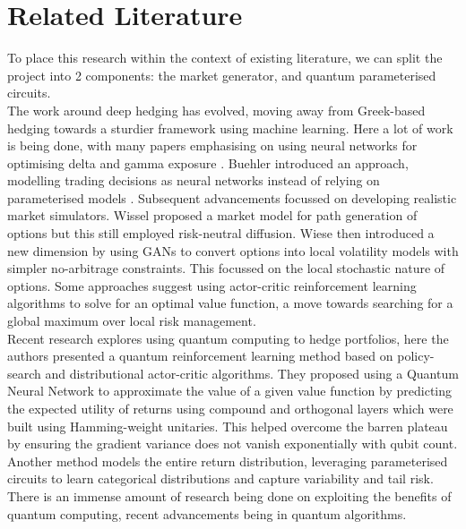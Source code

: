 \documentclass[12pt]{article}
\numberwithin{equation}{section}
\begin{document}
\section{Related Literature}
To place this research within the context of existing literature, we can split 
the project into 2 components: the market generator, and quantum parameterised circuits.
\\
The work around deep hedging has evolved, moving away from 
Greek-based hedging towards a sturdier framework using machine 
learning. Here a lot of work is being done, with many papers emphasising 
on using neural networks for optimising delta and gamma exposure
\autocite{armstrong_deep_2024,qiao_enhancing_2024}.
Buehler introduced an approach, modelling trading decisions 
as neural networks instead of relying on parameterised models
\autocite{buehler_deep_2019}. Subsequent advancements focussed on developing realistic market simulators. Wissel 
proposed a market model for path generation of options but this still 
employed risk-neutral diffusion\autocite{schweizer_arbitrage-free_2008}. Wiese then introduced 
a new dimension by using GANs to convert options into 
local volatility models with simpler no-arbitrage constraints. This focussed 
on the local stochastic nature of options.
\autocite{choudhary_funvol_2023,wiese_deep_2019,wiese_multi-asset_2021}
Some approaches suggest using actor-critic reinforcement learning algorithms to 
solve for an optimal value function, a move towards searching for a global
maximum over local risk management.
\autocite{buehler_deep_2022,movahed_introducing_2024}
\\
Recent research explores using quantum computing to 
hedge portfolios, here the authors presented a quantum reinforcement learning 
method based on policy-search and distributional actor-critic algorithms. 
They proposed using a Quantum Neural Network to approximate the value of a 
given value function by predicting the expected utility of returns using compound and orthogonal layers which were built using Hamming-weight
unitaries.\autocite{kerenidis_classical_2022} This helped overcome the barren plateau by ensuring the gradient 
variance does not vanish exponentially with qubit count. Another method models the entire return distribution, leveraging parameterised circuits to learn categorical distributions and capture variability and tail risk. 
\autocite{cherrat_quantum_2023,dasgupta_loading_2022}
\\
There is an immense amount of research being done on exploiting the benefits of 
quantum computing, recent advancements being in quantum algorithms. 
\end{document}
